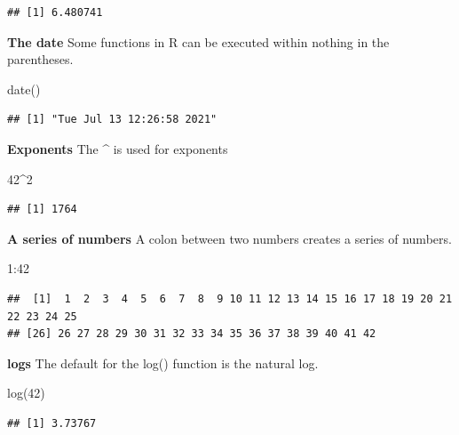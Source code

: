 \documentclass[
]{book}
\newenvironment{Shaded}{\begin{snugshade}}{\end{snugshade}}
\newcommand{\DecValTok}[1]{\textcolor[rgb]{0.00,0.00,0.81}{#1}}
\newcommand{\FunctionTok}[1]{\textcolor[rgb]{0.00,0.00,0.00}{#1}}
\newcommand{\NormalTok}[1]{#1}
\newcommand{\SpecialCharTok}[1]{\textcolor[rgb]{0.00,0.00,0.00}{#1}}
\begin{document}
\begin{verbatim}
## [1] 6.480741
\end{verbatim}

\textbf{The date}
Some functions in R can be executed within nothing in the parentheses.

\begin{Shaded}
\begin{Highlighting}[]
\FunctionTok{date}\NormalTok{()}
\end{Highlighting}
\end{Shaded}

\begin{verbatim}
## [1] "Tue Jul 13 12:26:58 2021"
\end{verbatim}

\textbf{Exponents}
The \textbf{\^{}} is used for exponents

\begin{Shaded}
\begin{Highlighting}[]
\DecValTok{42}\SpecialCharTok{\^{}}\DecValTok{2}
\end{Highlighting}
\end{Shaded}

\begin{verbatim}
## [1] 1764
\end{verbatim}

\textbf{A series of numbers}
A colon between two numbers creates a series of numbers.

\begin{Shaded}
\begin{Highlighting}[]
\DecValTok{1}\SpecialCharTok{:}\DecValTok{42}
\end{Highlighting}
\end{Shaded}

\begin{verbatim}
##  [1]  1  2  3  4  5  6  7  8  9 10 11 12 13 14 15 16 17 18 19 20 21 22 23 24 25
## [26] 26 27 28 29 30 31 32 33 34 35 36 37 38 39 40 41 42
\end{verbatim}

\textbf{logs}
The default for the log() function is the natural log.

\begin{Shaded}
\begin{Highlighting}[]
\FunctionTok{log}\NormalTok{(}\DecValTok{42}\NormalTok{)}
\end{Highlighting}
\end{Shaded}

\begin{verbatim}
## [1] 3.73767
\end{verbatim}
\end{document}
